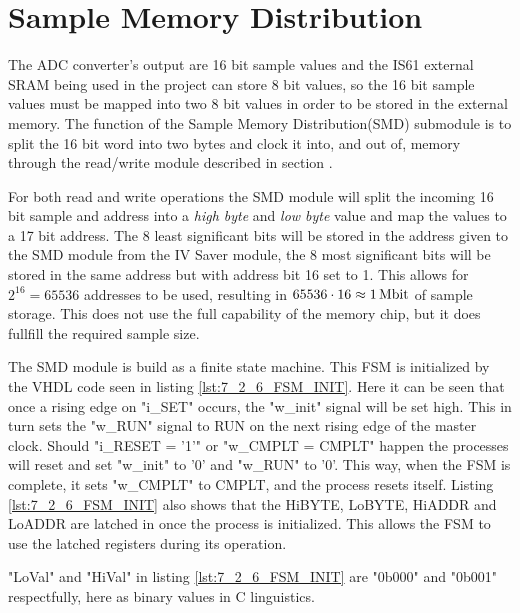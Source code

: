 \section{Sample Memory Distribution} \label{subsec:Sample_Memory_Distribution} 
The ADC converter's output are 16 bit sample values and the IS61 external SRAM being used in the project can store 8 bit values, so the 16 bit sample values must be mapped into two 8 bit values in order to be stored in the external memory. The function of the Sample Memory Distribution(SMD) submodule is to split the 16 bit word into two bytes and clock it into, and out of, memory through the read/write module described in section .

For both read and write operations the SMD module will split the incoming 16 bit sample and address into a \textit{high byte} and \textit{low byte} value and map the values to a 17 bit address. The 8 least significant bits will be stored in the address given to the SMD module from the IV Saver module, the 8 most significant bits will be stored in the same address but with address bit 16 set to 1. This allows for $2^{16} = 65536$ addresses to be used, resulting in $65536\cdot16 \approx \SIQ{1}{\mega\bit}$ of sample storage. This does not use the full capability of the memory chip, but it does fullfill the required sample size. 

The SMD module is build as a finite state machine. This FSM is initialized by the VHDL code seen in listing \ref{lst:7_2_6_FSM_INIT}. Here it can be seen that once a rising edge on "i\_SET" occurs, the "w\_init" signal will be set high. This in turn sets the "w\_RUN" signal to RUN on the next rising edge of the  master clock. Should "i\_RESET = '1'" or "w\_CMPLT = CMPLT" happen the processes will reset and set "w\_init" to '0' and "w\_RUN" to '0'. This way, when the FSM is complete, it sets "w\_CMPLT" to CMPLT, and the process resets itself. Listing \ref{lst:7_2_6_FSM_INIT} also shows that the HiBYTE, LoBYTE, HiADDR and LoADDR are latched in once the process is initialized. This allows the FSM to use the latched registers during its operation. 

"LoVal" and "HiVal" in listing \ref{lst:7_2_6_FSM_INIT} are "0b000" and "0b001" respectfully, here as binary values in C linguistics.

 

